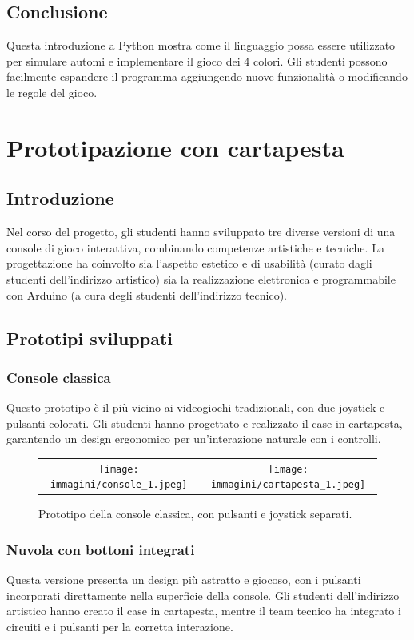 \documentclass[a4paper,12pt]{report}
\begin{document}
\section{Conclusione}
Questa introduzione a Python mostra come il linguaggio possa essere utilizzato per simulare automi e implementare il gioco dei 4 colori. Gli studenti possono facilmente espandere il programma aggiungendo nuove funzionalità o modificando le regole del gioco.

\chapter{Prototipazione con cartapesta}
\section{Introduzione}
Nel corso del progetto, gli studenti hanno sviluppato tre diverse versioni di una console di gioco interattiva, combinando competenze artistiche e tecniche. La progettazione ha coinvolto sia l'aspetto estetico e di usabilità (curato dagli studenti dell'indirizzo artistico) sia la realizzazione elettronica e programmabile con Arduino (a cura degli studenti dell'indirizzo tecnico).

\section{Prototipi sviluppati}

\subsection{Console classica}
Questo prototipo è il più vicino ai videogiochi tradizionali, con due joystick e pulsanti colorati. Gli studenti hanno progettato e realizzato il case in cartapesta, garantendo un design ergonomico per un'interazione naturale con i controlli.

\begin{figure}[h]
    \centering
    \begin{tabular}{c c}
        \texttt{[image: immagini/console\_1.jpeg]} &
        \texttt{[image: immagini/cartapesta\_1.jpeg]} \\
    \end{tabular}
    \caption{Prototipo della console classica, con pulsanti e joystick separati.}
    \label{fig:console_classica}
\end{figure}

\subsection{Nuvola con bottoni integrati}
Questa versione presenta un design più astratto e giocoso, con i pulsanti incorporati direttamente nella superficie della console. Gli studenti dell'indirizzo artistico hanno creato il case in cartapesta, mentre il team tecnico ha integrato i circuiti e i pulsanti per la corretta interazione.
\end{document}
